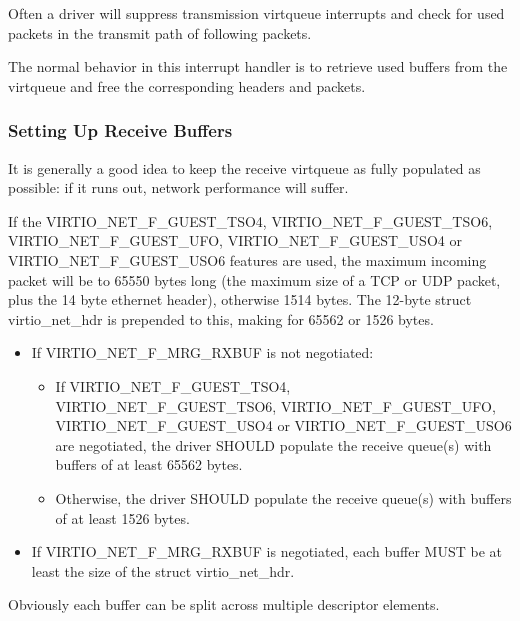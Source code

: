 Often a driver will suppress transmission virtqueue interrupts
and check for used packets in the transmit path of following
packets.

The normal behavior in this interrupt handler is to retrieve
used buffers from the virtqueue and free the corresponding
headers and packets.

\subsubsection{Setting Up Receive Buffers}\label{sec:Device Types / Network Device / Device Operation / Setting Up Receive Buffers}

It is generally a good idea to keep the receive virtqueue as
fully populated as possible: if it runs out, network performance
will suffer.

If the VIRTIO_NET_F_GUEST_TSO4, VIRTIO_NET_F_GUEST_TSO6,
VIRTIO_NET_F_GUEST_UFO, VIRTIO_NET_F_GUEST_USO4 or VIRTIO_NET_F_GUEST_USO6
features are used, the maximum incoming packet
will be to 65550 bytes long (the maximum size of a
TCP or UDP packet, plus the 14 byte ethernet header), otherwise
1514 bytes.  The 12-byte struct virtio_net_hdr is prepended to this,
making for 65562 or 1526 bytes.


\begin{itemize}
\item If VIRTIO_NET_F_MRG_RXBUF is not negotiated:
  \begin{itemize}
    \item If VIRTIO_NET_F_GUEST_TSO4, VIRTIO_NET_F_GUEST_TSO6, VIRTIO_NET_F_GUEST_UFO,
	VIRTIO_NET_F_GUEST_USO4 or VIRTIO_NET_F_GUEST_USO6 are negotiated, the driver SHOULD populate
      the receive queue(s) with buffers of at least 65562 bytes.
    \item Otherwise, the driver SHOULD populate the receive queue(s)
      with buffers of at least 1526 bytes.
  \end{itemize}
\item If VIRTIO_NET_F_MRG_RXBUF is negotiated, each buffer MUST be at
least the size of the struct virtio_net_hdr.
\end{itemize}

\begin{note}
Obviously each buffer can be split across multiple descriptor elements.
\end{note}

